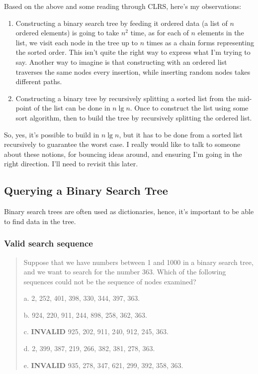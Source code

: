 \documentclass{article}
\begin{document}
Based on the above and some reading through CLRS, here's my observations:

\begin{enumerate}
  \item Constructing a binary search tree by feeding it ordered data (a list
    of $n$ ordered elements) is going to take $n^2$ time, as for each of $n$
    elements in the list, we visit each node in the tree up to $n$ times as
    a chain forms representing the sorted order. This isn't quite the right
    way to express what I'm trying to say. Another way to imagine is that
    constructing with an ordered list traverses the same nodes every insertion,
    while inserting random nodes takes different paths.
  \item Constructing a binary tree by recursively splitting a sorted list
    from the mid-point of the list can be done in $n\lg n$. Once to construct
    the list using some sort algorithm, then to build the tree by recursively
    splitting the ordered list.
\end{enumerate}

So, yes, it's possible to build in $n\lg n$, but it has to be done from a
sorted list recursively to guarantee the worst case. I really would like
to talk to someone about these notions, for bouncing ideas around, and
ensuring I'm going in the right direction. I'll need to revisit this later.


\subsection{Querying a Binary Search Tree}

Binary search trees are often used as dictionaries, hence, it's important
to be able to find data in the tree.

\subsubsection{Valid search sequence}

\begin{quote}
Suppose that we have numbers between 1 and 1000 in a binary search tree, and we
want to search for the number 363. Which of the following sequences could not be
the sequence of nodes examined?

a. 2, 252, 401, 398, 330, 344, 397, 363.

b. 924, 220, 911, 244, 898, 258, 362, 363.

c. \textbf{INVALID} 925, 202, 911, 240, 912, 245, 363.

d. 2, 399, 387, 219, 266, 382, 381, 278, 363.

e. \textbf{INVALID} 935, 278, 347, 621, 299, 392, 358, 363.
\end{quote}
\end{document}
